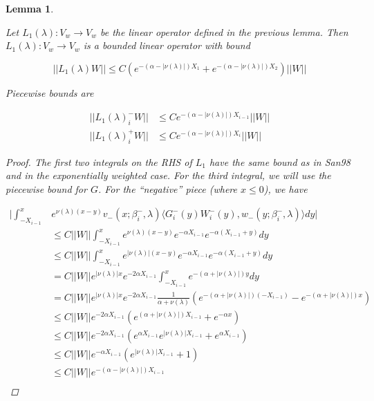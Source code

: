 \documentclass[12pt]{article}
\newtheorem{lemma}{Lemma}
\begin{document}
\begin{lemma}\label{L1better}

Let $L_1(\lambda): V_w \rightarrow V_w$ be the linear operator defined in the previous lemma. Then $L_1(\lambda): V_w \rightarrow V_w$ is a bounded linear operator with bound

\begin{equation}\label{L1bound2}
||L_1(\lambda)W|| \leq C ( e^{-(\alpha -|\nu(\lambda)|)X_1} + e^{-(\alpha -|\nu(\lambda)|)X_2})||W||
\end{equation}

Piecewise bounds are

\begin{align*}
||L_1(\lambda)_i^- W|| &\leq C e^{-(\alpha -|\nu(\lambda)|)X_{i-1}} ||W|| \\
||L_1(\lambda)_i^+ W|| &\leq C e^{-(\alpha -|\nu(\lambda)|)X_i} ||W||
\end{align*}

\begin{proof}
The first two integrals on the RHS of $L_1$ have the same bound as in San98 and in the exponentially weighted case. For the third integral, we will use the piecewise bound for $G$. For the ``negative'' piece (where $x \leq 0$), we have

\begin{align*}
\Big| \int_{-X_{i-1}}^x &e^{\nu(\lambda)(x-y)} v_-(x; \beta_i^-, \lambda) \langle G_i^-(y)W_i^-(y), w_-(y; \beta_i^-, \lambda) \rangle dy \Big| \\
&\leq C ||W|| \int_{-X_{i-1}}^x e^{\nu(\lambda)(x-y)} e^{-\alpha X_{i-1}}e^{-\alpha(X_{i-1} + y)}dy \\
&\leq C ||W|| \int_{-X_{i-1}}^x e^{|\nu(\lambda)| (x-y)} e^{-\alpha X_{i-1}}e^{-\alpha(X_{i-1} + y)}dy \\
&= C ||W|| e^{|\nu(\lambda)| x } e^{-2 \alpha X_{i-1}} \int_{-X_{i-1}}^x e^{-(\alpha + |\nu(\lambda)|) y} dy \\
&= C ||W|| e^{|\nu(\lambda)| x } e^{-2 \alpha X_{i-1}} \frac{1}{\alpha + \nu(\lambda)} \left( e^{-(\alpha + |\nu(\lambda)|)(-X_{i-1})} - e^{-(\alpha + |\nu(\lambda)|)x} \right) \\
&\leq C ||W|| e^{-2 \alpha X_{i-1}} \left( e^{(\alpha + |\nu(\lambda)|)X_{i-1}} + e^{-\alpha x}  \right) \\
&\leq C ||W|| e^{-2 \alpha X_{i-1}} \left( e^{\alpha X_{i-1}} e^{|\nu(\lambda)|X_{i-1}} + e^{\alpha X_{i-1}}  \right) \\
&\leq C ||W|| e^{-\alpha X_{i-1}} \left( e^{|\nu(\lambda)|X_{i-1}} + 1 \right) \\
&\leq C ||W|| e^{-(\alpha -|\nu(\lambda)|)X_{i-1}} \\
\end{align*}


\end{proof}
\end{lemma}
\end{document}
